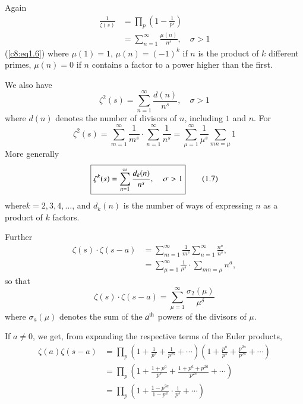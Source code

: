 \noindent
Again
\begin{align*}
\frac{1}{\zeta(s)} & = \prod\limits_p \left( 1-\frac{1}{p^s}\right)\\
& = \sum\limits^\infty_{n=1} \frac{\mu(n)}{n^s}, \quad \sigma >1 \tag{1.6}\label{c8:eq1.6}
\end{align*}
(\ref{c8:eq1.6}) where $\mu(1) =1$, $\mu (n) = (-1)^k$ if $n$ is the product of
$k$ different primes, $\mu(n) =0$ if $n$ contains a factor to a power
higher than the first.

We also have
$$
\zeta^2 (s) = \sum\limits^\infty_{n=1} \frac{d(n)}{n^s}, \quad \sigma >1
$$
where $d(n)$ denotes the number of divisors of $n$, including $1$ and
$n$. For 
$$
\zeta^2 (s) = \sum\limits^\infty_{m=1} \frac{1}{m^s}  \cdot
\sum\limits^\infty_{n=1} \frac{1}{n^s} = \sum\limits^\infty_{\mu=1}
\frac{1}{\mu^s} \sum\limits_{mn=\mu} 1
$$
More generally 
\begin{equation*}
\text{\fbox{$\zeta^k(s) = \sum\limits^\infty_{n=1}
    \dfrac{d_k(n)}{n^s}$, \quad $\sigma > 1$}} \tag{1.7}\label{c8:eq1.7}
\end{equation*}
where\pageoriginale $k=2,3,4,\ldots$, and $d_k(n)$ is the number of
ways of expressing $n$ as a product of $k$ factors.

Further 
\begin{align*}
\zeta(s) \cdot \zeta(s-a)& = \sum\limits^\infty_{m=1} \frac{1}{m^s}
\sum\limits^\infty_{n=1} \frac{n^a}{n^s},\\
& = \sum\limits^\infty_{\mu=1} \frac{1}{\mu^s} \cdot
\sum\limits_{mn=\mu} n^a,
\end{align*}
so that 
\begin{equation*}
\zeta(s) \cdot \zeta (s-a) = \sum\limits^\infty_{\mu=1}
\frac{\sigma_2(\mu)}{\mu^\delta} \tag{1.8}\label{c8:eq1.8}
\end{equation*}
where $\sigma_a (\mu)$ denotes the sum of the $a^{\rm th}$ powers of
the divisors of $\mu$.

If $a\neq 0$, we get, from expanding the respective terms of the Euler
products,
\begin{align*}
\zeta(a) \zeta (s-a) & = \prod\limits_p \left(1+\frac{1}{p^s} +
\frac{1}{p^{2s}}+ \cdots \right) \left(1+\frac{p^a}{p^s} +
\frac{p^{2a}}{p^{2s}} + \cdots \right) \\
& = \prod\limits_p \left(1+\frac{1+p^a}{p^s} +
\frac{1+p^a+p^{2a}}{p^{2s}} + \cdots \right)\\
& = \prod\limits_p  \left(1+\frac{1-p^{2a}}{1-p^a} \cdot \frac{1}{p^s}
+ \cdots\right)
\end{align*}

